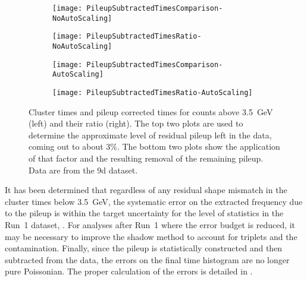 \begin{landscape}
    \begin{figure}
    \centering
        \begin{subfigure}[]{0.6\textwidth}
            \centering
            \texttt{[image: PileupSubtractedTimesComparison-NoAutoScaling]}
        \end{subfigure}%
        \hspace{1cm}
        \begin{subfigure}[]{0.6\textwidth}
            \centering
            \texttt{[image: PileupSubtractedTimesRatio-NoAutoScaling]}
        \end{subfigure}

        \begin{subfigure}[]{0.6\textwidth}
            \centering
            \texttt{[image: PileupSubtractedTimesComparison-AutoScaling]}
        \end{subfigure}%
        \hspace{1cm}
        \begin{subfigure}[]{0.6\textwidth}
            \centering
            \texttt{[image: PileupSubtractedTimesRatio-AutoScaling]}
        \end{subfigure}
    \caption[Cluster times above \SI{3.5}{\GeV}]{Cluster times and pileup corrected times for counts above \SI{3.5}{\GeV} (left) and their ratio (right). The top two plots are used to determine the approximate level of residual pileup left in the data, coming out to about 3\%. The bottom two plots show the application of that factor and the resulting removal of the remaining pileup. Data are from the 9d dataset.}
    \label{fig:PileupTimesRatio}
    \end{figure}
\end{landscape}




It has been determined that regardless of any residual shape mismatch in the cluster times below \SI{3.5}{\GeV}, the systematic error on the extracted \wa frequency due to the pileup is within the target uncertainty for the level of statistics in the Run~1 dataset, . For analyses after Run~1 where the error budget is reduced, it may be necessary to improve the shadow method to account for triplets and the contamination. Finally, since the pileup is statistically constructed and then subtracted from the data, the errors on the final time histogram are no longer pure Poissonian. The proper calculation of the errors is detailed in .


